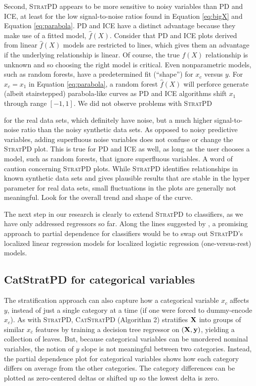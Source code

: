 \documentclass[12pt]{article}
\newcommand{\spd}{\fontfamily{cmr}\textsc{\small StratPD}}
\newcommand{\cspd}{\fontfamily{cmr}\textsc{\small CatStratPD}}
\newcommand{\xnc}{$x_{\overline{c}}$}
\begin{document}
Second, \spd{} appears to be more sensitive to noisy variables than PD and ICE, at least for the low signal-to-noise ratios found in Equation \eqref{eq:bigX} and Equation \eqref{eq:parabola}. PD and ICE have a distinct advantage because they make use of a fitted model, $\widehat{f}(X)$.  Consider that PD and ICE plots derived from linear $\widehat{f}(X)$ models are restricted to lines, which gives them an advantage if the underlying relationship is linear. Of course, the true $f(X)$ relationship is unknown and so choosing the right model is critical. Even nonparametric models, such as random forests, have a predetermined fit (``shape'') for $x_c$ versus $y$. For $x_c=x_1$ in Equation \eqref{eq:parabola}, a random forest $\widehat{f}(X)$ will perforce generate (albeit stairstepped) parabola-like curves as PD and ICE algorithms shift $x_1$ through range $[-1,1]$. We did not observe problems with \spd{{} for the real data sets, which definitely have noise, but a much higher signal-to-noise ratio than the noisy synthetic data sets.  As opposed to noisy predictive variables, adding superfluous noise variables does not confuse or change the \spd{} plot.  This is true for PD and ICE as well, as long as the user chooses a model, such as random forests, that ignore  superfluous variables. A word of caution concerning \spd{} plots. While \spd{} identifies relationships in known synthetic data sets and gives plausible results that are stable in the hyper parameter for real data sets, small fluctuations in the plots are generally not meaningful. Look for the overall trend and shape of the curve.

The next step in our research is clearly to extend \spd{} to classifiers, as we have only addressed regressors so far.  Along the lines suggested by \cite{PDP}, a promising approach to partial dependence for classifiers would be to swap out \spd{}'s localized linear regression models for localized logistic regression (one-versus-rest) models.


\begin{appendices}

\section{CatStratPD for categorical variables}\label{appendix:catstrat}

The stratification approach can also capture how a categorical variable $x_c$ affects $y$, instead of just a single category at a time (if one were forced to dummy-encode $x_c$). As with \spd{},  \cspd{} (Algorithm 2) stratifies $\bf X$ into groups of similar \xnc{} features by training a decision tree regressor on $({\bf X}, {\bf y})$, yielding a collection of leaves. But, because categorical variables can be unordered nominal variables, the notion of $y$ slope is not meaningful between two categories.  Instead, the partial dependence plot for categorical variables shows how each category differs on average from the other categories. The category differences can be plotted as zero-centered deltas or shifted up so the lowest delta is zero.


\end{appendices}}
\end{document}

